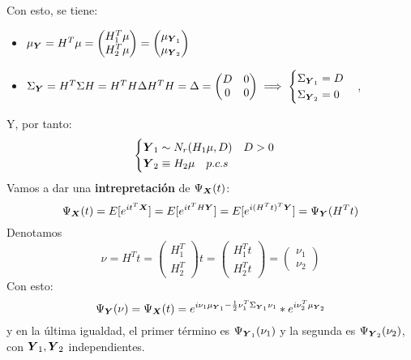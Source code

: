 Con esto, se tiene:
\begin{itemize}
\item $\mu_{\boldsymbol{Y}} = H^T \mu = \begin{pmatrix} H_1^T \mu \\ H_2^T\mu \end{pmatrix} = \begin{pmatrix} \mu_{\boldsymbol{Y}_1} \\ \mu_{\boldsymbol{Y}_2} \end{pmatrix}$
  \item $\Sigma_{\boldsymbol{Y}} =  H^T \Sigma H = H^T H \Delta H^T H = \Delta = \begin{pmatrix} D & 0 \\ 0 & 0 \end{pmatrix} \implies \begin{cases} \Sigma_{\boldsymbol{Y}_1} = D \\ \Sigma_{\boldsymbol{Y}_2} = 0\end{cases}$,
\end{itemize}
Y, por tanto:
\[
\begin{cases} \boldsymbol{Y}_1 \sim N_r(H_1\mu,D) \quad D> 0 \\ \boldsymbol{Y}_2 \equiv H_2\mu \quad p.c.s \end{cases}
\]
Vamos a dar una \textbf{intrepretación} de $\Psi_{\boldsymbol{X}} (t)$:
\[
\Psi_{\boldsymbol{X}}(t) = E[e^{it^T\boldsymbol{X}}] = E[e^{it^TH\boldsymbol{Y}}] = E[e^{i(H^Tt)^T \boldsymbol{Y}}] = \Psi_{\boldsymbol{Y}}(H^T t)
\]
Denotamos
\[
\nu = H^T t = \begin{pmatrix} H_1^T \\ H_2^T\end{pmatrix}t = \begin{pmatrix} H_1^Tt \\ H_2^Tt\end{pmatrix} = \begin{pmatrix} \nu_1 \\ \nu_2\end{pmatrix}
\]
Con esto:
\[
\Psi_{\boldsymbol{Y}}(\nu) = \Psi_{\boldsymbol{X}}(t) = e^{i\nu_1\mu_{\boldsymbol{Y}_1} - \frac{1}{2} \nu_1^T \Sigma_{\boldsymbol{Y}_1}\nu_1}* e^{i\nu_2^T \mu_{\boldsymbol{Y}_2}}
\]
y en la última igualdad, el primer término es $\Psi_{\boldsymbol{Y}_1}(\nu_1)$ y la segunda es $\Psi_{\boldsymbol{Y}_2}(\nu_2)$, con $\boldsymbol{Y}_1,\boldsymbol{Y}_2$ independientes.\\

